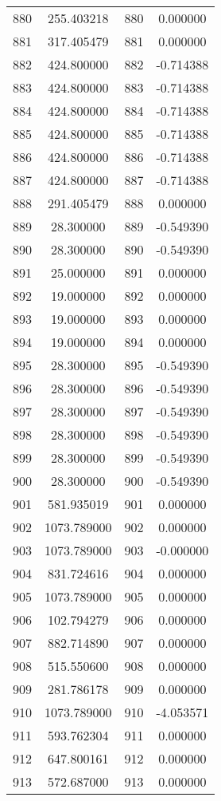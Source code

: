 \documentclass[12pt]{article}
\begin{document}
\begin{longtable}{@{}cccc@{}}
880 & 255.403218 & 880 & 0.000000 \\
881 & 317.405479 & 881 & 0.000000 \\
882 & 424.800000 & 882 & -0.714388 \\
883 & 424.800000 & 883 & -0.714388 \\
884 & 424.800000 & 884 & -0.714388 \\
885 & 424.800000 & 885 & -0.714388 \\
886 & 424.800000 & 886 & -0.714388 \\
887 & 424.800000 & 887 & -0.714388 \\
888 & 291.405479 & 888 & 0.000000 \\
889 & 28.300000 & 889 & -0.549390 \\
890 & 28.300000 & 890 & -0.549390 \\
891 & 25.000000 & 891 & 0.000000 \\
892 & 19.000000 & 892 & 0.000000 \\
893 & 19.000000 & 893 & 0.000000 \\
894 & 19.000000 & 894 & 0.000000 \\
895 & 28.300000 & 895 & -0.549390 \\
896 & 28.300000 & 896 & -0.549390 \\
897 & 28.300000 & 897 & -0.549390 \\
898 & 28.300000 & 898 & -0.549390 \\
899 & 28.300000 & 899 & -0.549390 \\
900 & 28.300000 & 900 & -0.549390 \\
901 & 581.935019 & 901 & 0.000000 \\
902 & 1073.789000 & 902 & 0.000000 \\
903 & 1073.789000 & 903 & -0.000000 \\
904 & 831.724616 & 904 & 0.000000 \\
905 & 1073.789000 & 905 & 0.000000 \\
906 & 102.794279 & 906 & 0.000000 \\
907 & 882.714890 & 907 & 0.000000 \\
908 & 515.550600 & 908 & 0.000000 \\
909 & 281.786178 & 909 & 0.000000 \\
910 & 1073.789000 & 910 & -4.053571 \\
911 & 593.762304 & 911 & 0.000000 \\
912 & 647.800161 & 912 & 0.000000 \\
913 & 572.687000 & 913 & 0.000000 \\

\end{longtable}
\end{document}
